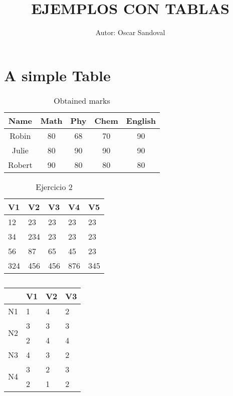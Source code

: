\documentclass{article}
\title{EJEMPLOS CON TABLAS}
\author{Autor: Oscar Sandoval}
\begin{document}
\maketitle
    \section{A simple Table}
        \begin{table}[!hbt]
            \centering
            \caption{Obtained marks}
            \vspace{5mm}
            \label{Tabla1}
            
            \begin{tabular}{|c|c|c|c|c|}
               \hline Name & Math & Phy & Chem & English \\
               \hline Robin & 80 & 68 & 70 & 90 \\
               \hline Julie & 80 & 90 & 90 & 90 \\
               \hline Robert & 90 & 80 & 80 & 80 \\
               \hline
            \end{tabular}

        \end{table}

\begin{table}[h]
\centering
\caption{Ejercicio 2}
\label{tab:Tabla2}
\begin{tabular}{|l|l|l|l|l|}
\hline
V1  & V2  & V3  & V4  & V5  \\ \hline
12  & 23  & 23  & 23  & 23  \\ \hline
34  & 234 & 23  & 23  & 23  \\ \hline
56  & 87  & 65  & 45  & 23  \\ \hline
324 & 456 & 456 & 876 & 345 \\ \hline
\end{tabular}
\end{table}

\begin{table}[h]
\centering
\caption{}
\label{tab:my-table}
\begin{tabular}{|c|l|l|l|}
\hline
\multicolumn{1}{|l|}{} & \multicolumn{1}{c|}{V1} & \multicolumn{1}{c|}{V2} & \multicolumn{1}{c|}{V3} \\ \hline
N1                  & 1 & 4 & 2 \\ \hline
\multirow{2}{*}{N2} & 3 & 3 & 3 \\ \cline{2-4} 
                    & 2 & 4 & 4 \\ \hline
N3                  & 4 & 3 & 2 \\ \hline
\multirow{2}{*}{N4} & 3 & 2 & 3 \\ \cline{2-4} 
                    & 2 & 1 & 2 \\ \hline
\end{tabular}
\end{table}
\end{document}
